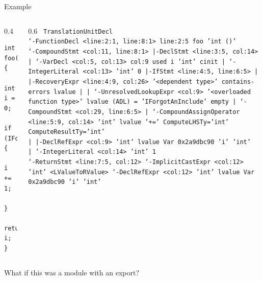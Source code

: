 \documentclass[aspectratio=169]{beamer}
\begin{document}
\begin{frame}[fragile]{Example}
  \begin{columns}
    \begin{column}{0.4\textwidth}
      \begin{verbatim}
int foo() {
    int i = 0;
    if (IForgotAnInclude()) {
        i += 1;
    }
    return i;
}
    \end{verbatim}
    \end{column}
    \begin{column}{0.6\textwidth}
      \tiny\texttt{
      TranslationUnitDecl \\
      `-FunctionDecl <line:2:1, line:8:1> line:2:5 foo 'int ()' \\
      `-CompoundStmt <col:11, line:8:1> \\
      |-DeclStmt <line:3:5, col:14> \\
      | `-VarDecl <col:5, col:13> col:9 used i 'int' cinit \\
      |   `-IntegerLiteral <col:13> 'int' 0 \\
      |-IfStmt <line:4:5, line:6:5> \\
      | |-{\color{red}RecoveryExpr <line:4:9, col:26> '<dependent type>' contains-errors} lvalue \\
      | | `-{\color{purple}UnresolvedLookupExpr <col:9> '<overloaded function type>' lvalue (ADL) = 'IForgotAnInclude' empty} \\
      | `-CompoundStmt <col:29, line:6:5> \\
      |   `-CompoundAssignOperator <line:5:9, col:14> 'int' lvalue '+=' ComputeLHSTy='int' ComputeResultTy='int' \\
      |     |-DeclRefExpr <col:9> 'int' lvalue Var 0x2a9dbc90 'i' 'int' \\
      |     `-IntegerLiteral <col:14> 'int' 1 \\
      `-ReturnStmt <line:7:5, col:12> \\
      `-ImplicitCastExpr <col:12> 'int' <LValueToRValue> \\
      `-DeclRefExpr <col:12> 'int' lvalue Var 0x2a9dbc90 'i' 'int'
      }
    \end{column}
  \end{columns}
  \vspace{1em}
  \begin{center}
    \small What if this was a module with an export?
  \end{center}
\end{frame}
\end{document}
